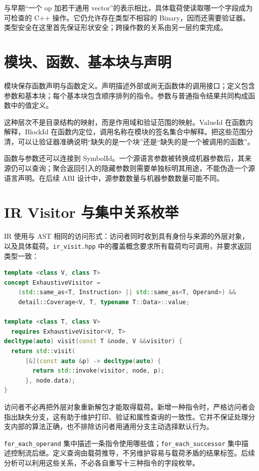 与早期“一个 op 加若干通用 vector”的表示相比，具体载荷使读取哪一个字段成为可检查的 C++ 操作。它仍允许存在类型不相容的 Binary，因而还需要验证器。类型安全在这里首先保证形状安全；跨操作数的关系由另一层约束完成。

\section{模块、函数、基本块与声明}
模块保存函数声明与函数定义。声明描述外部或尚无函数体的调用接口；定义包含参数和基本块；每个基本块包含顺序排列的指令。参数与普通指令结果共同构成函数中的值定义。

这种层次不是目录结构的映射，而是作用域和验证范围的映射。ValueId 在函数内解释，BlockId 在函数内定位，调用名称在模块的签名集合中解释。把这些范围分清，可以让验证器准确说明“缺失的是一个块”还是“缺失的是一个被调用的函数”。

函数与参数还可以连接到 SymbolId。一个源语言参数被转换成机器参数后，其来源仍可以查询；聚合返回引入的隐藏参数则需要单独标明其用途，不能伪造一个源语言声明。在后续 ABI 设计中，源参数数量与机器参数数量可能不同。

\section{IR Visitor 与集中关系枚举}
IR 使用与 AST 相同的访问形式：访问者同时收到具有身份与来源的外层对象，以及具体载荷。\texttt{ir\_visit.hpp} 中的覆盖概念要求所有载荷均可调用，并要求返回类型一致：
\begin{lstlisting}[language=C++,caption={当前 IR 访问入口的节选}]
template <class V, class T>
concept ExhaustiveVisitor =
    (std::same_as<T, Instruction> || std::same_as<T, Operand>) &&
    detail::Coverage<V, T, typename T::Data>::value;

template <class T, class V>
  requires ExhaustiveVisitor<V, T>
decltype(auto) visit(const T &node, V &&visitor) {
  return std::visit(
      [&](const auto &p) -> decltype(auto) {
        return std::invoke(visitor, node, p);
      }, node.data);
}
\end{lstlisting}
访问者不必再把外层对象重新解包才能取得载荷。新增一种指令时，严格访问者会指出缺失分支，这有助于维护打印、验证和属性查询的一致性。它并不保证处理分支内部的算法正确，也不排除访问者用通用分支主动选择默认行为。

\texttt{for\_each\_operand} 集中描述一条指令使用哪些值；\texttt{for\_each\_successor} 集中描述控制流后继。定义查询由载荷推导，不另维护容易与载荷矛盾的结果标签。后续分析可以利用这些关系，不必各自重写十三种指令的字段枚举。

